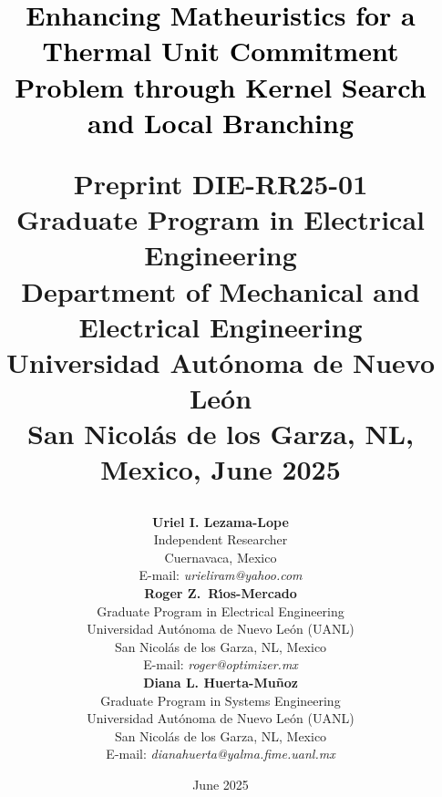 \documentclass[letterpaper,titlepage,11pt]{article}
\title{
\textbf{
\textcolor{black}{Enhancing Matheuristics for a Thermal Unit Commitment Problem through Kernel Search and Local Branching}}\\[2em]
\begin{mybox}
\center\small Preprint DIE-RR25-01\\
Graduate Program in Electrical Engineering\\
Department of Mechanical and Electrical Engineering\\
Universidad Aut\'onoma de Nuevo Le\'on\\
San Nicol\'as de los Garza, NL, Mexico, June 2025
\end{mybox}}
\author{%
\textbf{Uriel I. Lezama-Lope}\\%
Independent Researcher\\
Cuernavaca, Mexico\\%
E-mail: \textit{urieliram@yahoo.com}\\[1em]
%
\textbf{Roger Z.\ R\'{\i}os-Mercado}\\%
Graduate Program in Electrical Engineering\\%
Universidad Aut\'onoma de Nuevo Le\'on (UANL)\\%
San Nicol\'as de los Garza, NL, Mexico\\%
E-mail: \textit{roger@optimizer.mx}\\[1em]
\textbf{Diana L. Huerta-Mu{\~n}oz}\\%
Graduate Program in Systems Engineering\\%
Universidad Aut\'onoma de Nuevo Le\'on (UANL)\\%
San Nicol\'as de los Garza, NL, Mexico\\%
E-mail: \textit{dianahuerta@yalma.fime.uanl.mx}\\
}
\date{June 2025}
\begin{document}
\maketitle

\begin{abstract}




\end{abstract}
\end{document}
